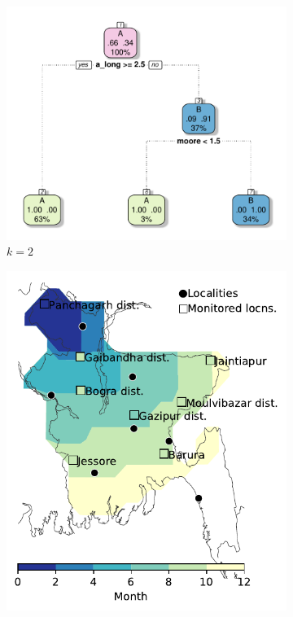 \documentclass{article}
\begin{document}
\begin{figure}[!t]
\centering
\begin{subfigure}[b]{.32\textwidth}
    \includegraphics[width=\textwidth,trim=.6cm .6cm .6cm .6cm,clip]{../clustering/results/agglomerative/cart_cAB_agg.pdf}
\caption{$k=2$}
\end{subfigure}
\begin{subfigure}[b]{.32\textwidth}
    \includegraphics[width=\textwidth]{../cellular_automata/results/contour/BGD_model-A.pdf}

\end{subfigure}
\end{figure}
\end{document}
